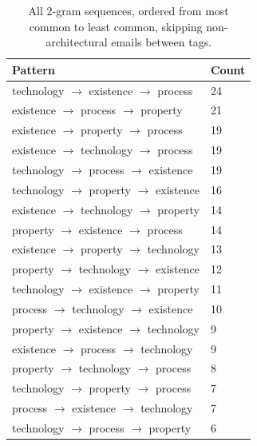 \documentclass[a4paper, 12pt]{article}
\begin{document}
		\begin{table}[H]
			\centering
			\caption{All 2-gram sequences, ordered from most common to least common, skipping non-architectural emails between tags.}
			\begin{tabular}{|l|l|}
				\hline
				\textbf{Pattern} & \textbf{Count} \\ \hline
				technology  $ \rightarrow $ existence   $ \rightarrow $ process     & 24 \\ \hline
				existence   $ \rightarrow $ process     $ \rightarrow $ property    & 21 \\ \hline
				existence   $ \rightarrow $ property    $ \rightarrow $ process     & 19 \\ \hline
				existence   $ \rightarrow $ technology  $ \rightarrow $ process     & 19 \\ \hline
				technology  $ \rightarrow $ process     $ \rightarrow $ existence   & 19 \\ \hline
				technology  $ \rightarrow $ property    $ \rightarrow $ existence   & 16 \\ \hline
				existence   $ \rightarrow $ technology  $ \rightarrow $ property    & 14 \\ \hline
				property    $ \rightarrow $ existence   $ \rightarrow $ process     & 14 \\ \hline
				existence   $ \rightarrow $ property    $ \rightarrow $ technology  & 13 \\ \hline
				property    $ \rightarrow $ technology  $ \rightarrow $ existence   & 12 \\ \hline
				technology  $ \rightarrow $ existence   $ \rightarrow $ property    & 11 \\ \hline
				process     $ \rightarrow $ technology  $ \rightarrow $ existence   & 10 \\ \hline
				property    $ \rightarrow $ existence   $ \rightarrow $ technology  & 9 \\ \hline
				existence   $ \rightarrow $ process     $ \rightarrow $ technology  & 9 \\ \hline
				property    $ \rightarrow $ technology  $ \rightarrow $ process     & 8 \\ \hline
				technology  $ \rightarrow $ property    $ \rightarrow $ process     & 7 \\ \hline
				process     $ \rightarrow $ existence   $ \rightarrow $ technology  & 7 \\ \hline
				technology  $ \rightarrow $ process     $ \rightarrow $ property    & 6 \\ \hline

\end{tabular}
\end{table}
\end{document}

